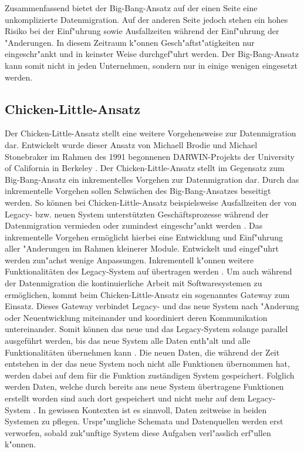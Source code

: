 \lb
Zusammenfassend bietet der Big-Bang-Ansatz auf der einen Seite eine unkomplizierte Datenmigration. Auf der anderen Seite jedoch stehen ein hohes Risiko bei der Einf"uhrung sowie Ausfallzeiten während der Einf"uhrung der "Anderungen. In diesem Zeitraum k"onnen Gesch"aftst"atigkeiten nur eingeschr"ankt und in keinster Weise durchgef"uhrt werden. Der Big-Bang-Ansatz kann somit nicht in jeden Unternehmen, sondern nur in einige wenigen eingesetzt werden. 

\subsection{Chicken-Little-Ansatz}


Der Chicken-Little-Ansatz stellt eine weitere Vorgehensweise zur Datenmigration dar. Entwickelt wurde dieser Ansatz von Michaell Brodie und Michael Stonebraker im Rahmen des 1991 begonnenen DARWIN-Projekts der University of California in Berkeley \citep{zoulafy-2002}. Der Chicken-Little-Ansatz stellt im Gegensatz zum Big-Bang-Ansatz ein inkrementelles Vorgehen zur Datenmigration dar. Durch das inkrementelle Vorgehen sollen Schwächen des Big-Bang-Ansatzes beseitigt werden. So können bei Chicken-Little-Ansatz beispielsweise Ausfallzeiten der von Legacy- bzw. neuen System unterstützten Geschäftsprozesse während der Datenmigration vermieden oder zumindest eingeschr"ankt werden \citep{zoulafy-2002}.
\lb
Das inkrementelle Vorgehen ermöglicht hierbei eine Entwicklung und Einf"uhrung aller "Anderungen im Rahmen kleinerer Module. Entwickelt und eingef"uhrt werden zun"achst wenige Anpassungen. Inkrementell k"onnen weitere Funktionalitäten des Legacy-System auf übertragen werden \citep[S.~2]{wuLawless-1997} .
\lb
Um auch während der Datenmigration die kontinuierliche Arbeit mit Softwaresystemen zu ermöglichen, kommt beim Chicken-Little-Ansatz ein sogenanntes Gateway zum Einsatz. Dieses Gateway verbindet Legacy- und das neue System nach "Anderung oder Neuentwicklung miteinander und koordiniert deren Kommunikation untereinander. Somit können das neue und das Legacy-System solange parallel ausgeführt werden, bis das neue System alle Daten enth"alt und alle Funktionalitäten übernehmen kann \citep[S.~2]{wuLawless-1997}. Die neuen Daten, die während der Zeit entstehen in der das neue System noch nicht alle Funktionen übernommen hat, werden dabei auf dem für die Funktion zuständigen System gespeichert. Folglich werden Daten, welche durch bereits ans neue System übertragene Funktionen erstellt worden sind auch dort gespeichert und nicht mehr auf dem Legacy-System \citep[S.~2]{wuLawless-1997}. In gewissen Kontexten ist es sinnvoll, Daten zeitweise in beiden Systemen zu pflegen. Urspr"ungliche Schemata und Datenquellen werden erst verworfen, sobald zuk"unftige System diese Aufgaben verl"asslich erf"ullen k"onnen.
